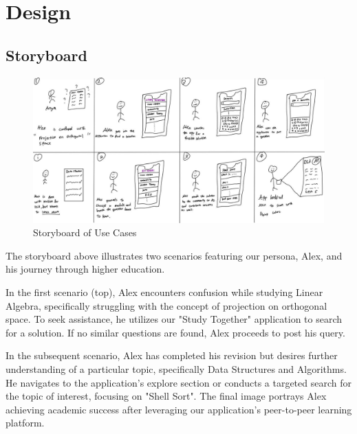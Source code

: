
\chapter{Design}\label{ch:design}

\section{Storyboard}

\begin{figure}[h]
       \centering
       \includegraphics[width=\textwidth]{Figures/storyboard.jpg}
       \caption{Storyboard of Use Cases}
       \label{storyboard}
\end{figure}

The storyboard above illustrates two scenarios featuring our persona, Alex, and his journey through higher education.

In the first scenario (top), Alex encounters confusion while studying Linear Algebra, specifically struggling with the concept of projection on orthogonal space. To seek assistance, he utilizes our "Study Together" application to search for a solution. If no similar questions are found, Alex proceeds to post his query.

In the subsequent scenario, Alex has completed his revision but desires further understanding of a particular topic, specifically Data Structures and Algorithms. He navigates to the application's explore section or conducts a targeted search for the topic of interest, focusing on "Shell Sort". The final image portrays Alex achieving academic success after leveraging our application's peer-to-peer learning platform.

